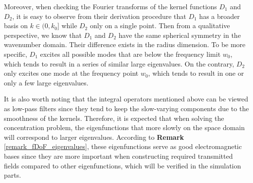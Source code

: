 \documentclass[12pt,draftclsnofoot,journal,onecolumn]{IEEEtran}
\begin{document}
{Moreover, when checking the Fourier transforms of the kernel functions $D_1$ and $D_2$, it is easy to observe from their derivation procedure that $D_1$ has a broader basis on $k \in (0,k_0]$ while $D_2$ only on a single point. Then from a qualitative perspective, we know that $D_1$ and $D_2$ have the same spherical symmetry in the wavenumber domain. Their difference exists in the radius dimension. To be more specific,
$D_1$ excites all possible modes that are below the frequency limit $w_0$, which tends to result in a series of similar large eigenvalues. On the contrary, $D_2$ only excites one mode at the frequency point $w_0$, which tends to result in one or only a few large eigenvalues. 

It is also worth noting that the integral operators mentioned above can be viewed as low-pass filters since they tend to keep the slow-varying components due to the smoothness of the kernels. Therefore, it is expected that when solving the concentration problem, the eigenfunctions that more slowly on the space domain will correspond to larger eigenvalues. According to {\bf Remark} \ref{remark_fDoF_eigenvalues}, these eigenfunctions serve as good electromagnetic bases since they are more important when constructing required transmitted fields compared to other eigenfunctions, which will be verified in the simulation parts.
}
\end{document}
